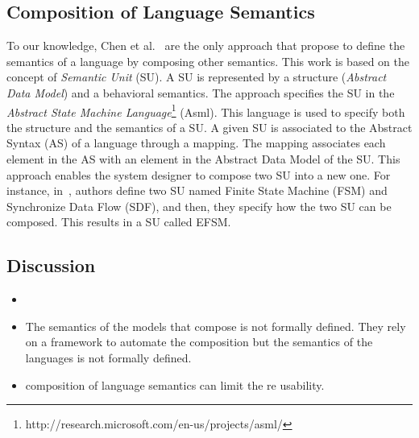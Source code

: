 
\subsection{Composition of Language Semantics}
To our knowledge, Chen et al.~\cite{semanticsanchoring} are the only approach that propose to define the semantics of a language by composing other semantics. This work is based on the concept of \emph{Semantic Unit} (SU). A SU is represented by a structure (\emph{Abstract Data Model}) and a behavioral semantics. The approach specifies the SU in the \emph{Abstract State Machine Language}\footnote{http://research.microsoft.com/en-us/projects/asml/} (Asml). This language is used to specify both the structure and the semantics of a SU. A given SU is associated to the Abstract Syntax (AS) of a language through a mapping. The mapping associates each element in the AS with an element in the Abstract Data Model of the SU. This approach  enables the system designer to compose two SU into a new one. For instance, in~\cite{composemanticanch}, authors define two SU named Finite State Machine (FSM) and Synchronize Data Flow (SDF), and then, they specify how the two SU can be composed. This results in a SU called EFSM.  

\subsection{Discussion}
		\begin{itemize}
			\item  {} 
			\item The semantics of the models that compose is not formally defined. They rely on a framework to automate the composition but the semantics of the languages is not formally defined.
			\item composition of language semantics can limit the re usability. 
		\end{itemize}